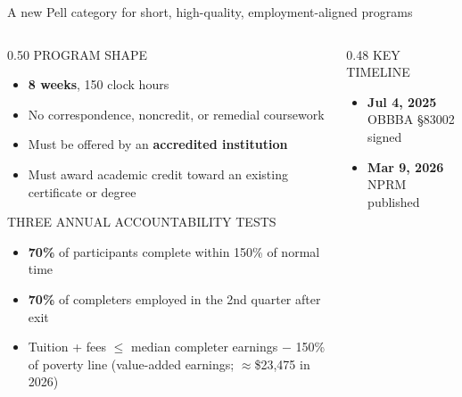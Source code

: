 \documentclass[aspectratio=169,11pt]{beamer}
\newcommand{\eyebrow}[1]{%
  {\sffamily\fontsize{7.5pt}{9pt}\selectfont
   \color{textMuted}%
   \MakeUppercase{#1}%
  }%
}
\newcommand{\theEyebrowText}{}
\newcommand{\frametitleEyebrow}[1]{\renewcommand{\theEyebrowText}{#1}}
\begin{document}
\frametitleEyebrow{Federal / Workforce Pell Grant}
\begin{frame}{A new Pell category for short, high-quality, employment-aligned programs}
  \begin{columns}[T,onlytextwidth]
    \begin{column}{0.50\textwidth}
      \rmfamily\fontsize{10pt}{13pt}\selectfont
      \color{textPrimary}
      \eyebrow{program shape}
      \vspace{2pt}
      \begin{itemize}\itemsep1pt
        \item \textbf{8 weeks}, 150 clock hours
        \item No correspondence, noncredit, or remedial coursework
        \item Must be offered by an \textbf{accredited institution}
        \item Must award academic credit toward an existing
              certificate or degree
      \end{itemize}
      \vspace{8pt}
      \eyebrow{three annual accountability tests}
      \vspace{2pt}
      \begin{itemize}\itemsep1pt
        \item \textbf{70\%} of participants complete within
              150\% of normal time
        \item \textbf{70\%} of completers employed in the
              2nd quarter after exit
        \item Tuition + fees $\leq$ median completer earnings
              $-$ 150\% of poverty line
              ({\color{textMuted}value-added earnings; $\approx$\$23{,}475 in 2026})
      \end{itemize}
    \end{column}
    \begin{column}{0.48\textwidth}
      \rmfamily\fontsize{10pt}{13pt}\selectfont
      \color{textPrimary}
      \eyebrow{key timeline}
      \vspace{2pt}
      \begin{itemize}\itemsep1pt
        \item \textbf{Jul 4, 2025} \textemdash{} OBBBA \S 83002 signed
        \item \textbf{Mar 9, 2026} \textemdash{} NPRM published

\end{itemize}
\end{column}
\end{columns}
\end{frame}
\end{document}
